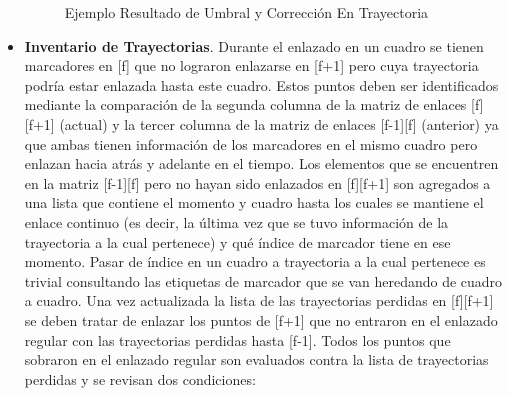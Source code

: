 \begin{itemize}
\begin{figure}[ht!]
 \centering
 \caption{Ejemplo Resultado de Umbral y Corrección En Trayectoria}
\label{distro_acc_track_m13_fix}
\end{figure}
\item \textbf{Inventario de Trayectorias}. Durante el enlazado en un cuadro se tienen marcadores en [f] que no lograron enlazarse en [f+1] pero cuya trayectoria podría estar enlazada hasta este cuadro.
Estos puntos deben ser identificados mediante la comparación de la segunda columna de la matriz de enlaces [f][f+1] (actual) y la tercer columna de la matriz de enlaces [f-1][f] (anterior) ya que ambas tienen información de los marcadores en el mismo cuadro pero enlazan hacia atrás y adelante en el tiempo.
Los elementos que se encuentren en la matriz [f-1][f] pero no hayan sido enlazados en [f][f+1] son agregados a una lista que contiene el momento y cuadro hasta los cuales se mantiene el enlace continuo (es decir, la última vez que se tuvo información de la trayectoria a la cual pertenece) y qué índice de marcador tiene en ese momento. Pasar de índice en un cuadro a trayectoria a la cual pertenece es trivial consultando las etiquetas de marcador que se van heredando de cuadro a cuadro.
Una vez actualizada la lista de las trayectorias perdidas en [f][f+1] se deben tratar de enlazar los puntos de [f+1] que no entraron en el enlazado regular con las trayectorias perdidas hasta [f-1]. Todos los puntos que sobraron en el enlazado regular son evaluados contra la lista de trayectorias perdidas y se revisan dos condiciones:


\end{itemize}
